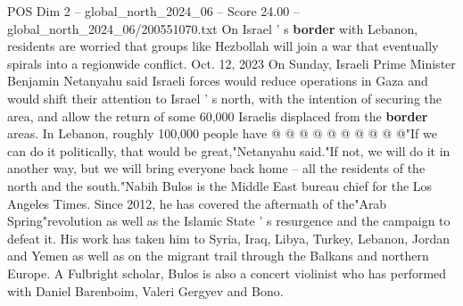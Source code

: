 \begin{textsample}{POS Dim 2 – global\_north\_2024\_06 – Score 24.00 – global\_north\_2024\_06/200551070.txt}
On Israel ' s \textbf{border} with Lebanon, residents are worried that groups like Hezbollah will join a war that eventually spirals into a regionwide conflict.
Oct. 12, 2023 On Sunday, Israeli Prime Minister Benjamin Netanyahu said Israeli forces would reduce operations in Gaza and would shift their attention to Israel ' s north, with the intention of securing the area, and allow the return of some 60,000 Israelis displaced from the \textbf{border} areas.
In Lebanon, roughly 100,000 people have @ @ @ @ @ @ @ @ @ @"If we can do it politically, that would be great,"Netanyahu said."If not, we will do it in another way, but we will bring everyone back home -- all the residents of the north and the south."Nabih Bulos is the Middle East bureau chief for the Los Angeles Times.
Since 2012, he has covered the aftermath of the"Arab Spring"revolution as well as the Islamic State ' s resurgence and the campaign to defeat it.
His work has taken him to Syria, Iraq, Libya, Turkey, Lebanon, Jordan and Yemen as well as on the migrant trail through the Balkans and northern Europe.
A Fulbright scholar, Bulos is also a concert violinist who has performed with Daniel Barenboim, Valeri Gergyev and Bono.

\end{textsample}
